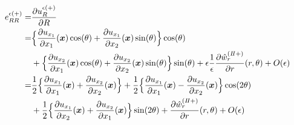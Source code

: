 \begin{align}
	e_{RR}^{\epsilon(+)}
		=&\frac{\partial u_{R}^{\epsilon(+)}}{\partial R}
		\nonumber
		\\
		=&\Bigl\{ \frac{\partial u_{x_{1}}}{\partial x_{1}}(\bm{x})\cos(\theta)
			+\frac{\partial u_{x_{1}}}{\partial x_{2}}(\bm{x})\sin(\theta)\Bigr\}\cos(\theta)
		\nonumber
		\\
		&+\Bigl\{ \frac{\partial u_{x_{2}}}{\partial x_{1}}(\bm{x})\cos(\theta)
			+\frac{\partial u_{x_{2}}}{\partial x_{2}}(\bm{x})\sin(\theta)\Bigr\}\sin(\theta)
		+\epsilon\frac{1}{\epsilon}\frac{\partial\hat{w}_{r}^{(I\hspace{-.15em}I+)}}{\partial r}(r,\theta)+O(\epsilon)
		\nonumber
		\\
		=&\frac{1}{2}\Bigl\{ \frac{\partial u_{x_{1}}}{\partial x_{1}}(\bm{x})
			+\frac{\partial u_{x_{2}}}{\partial x_{2}}(\bm{x})\Bigr\}
		+\frac{1}{2}\Bigl\{ \frac{\partial u_{x_{1}}}{\partial x_{1}}(\bm{x})
			-\frac{\partial u_{x_{2}}}{\partial x_{2}}(\bm{x})\Bigr\}\cos(2\theta)
		\nonumber
		\\
		&+\frac{1}{2}\Bigl\{ \frac{\partial u_{x_{1}}}{\partial x_{2}}(\bm{x})
			+\frac{\partial u_{x_{2}}}{\partial x_{1}}(\bm{x})\Bigr\}\sin(2\theta)
		+\frac{\partial\hat{w}_{r}^{(I\hspace{-.15em}I+)}}{\partial r}(r,\theta)+O(\epsilon)
		\label{eq:eRROutEps}
\end{align}
